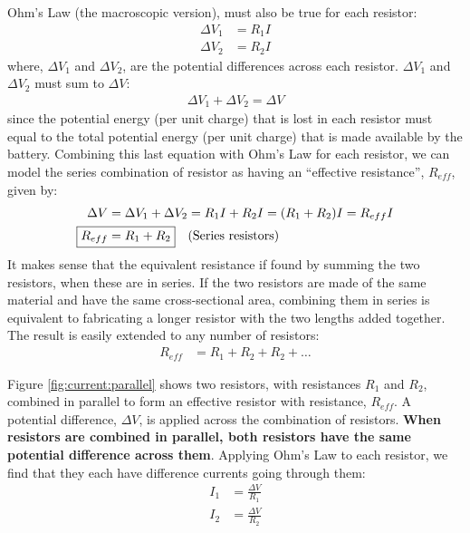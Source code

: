 Ohm's Law (the macroscopic version), must also be true for each resistor:
\begin{align*}
\Delta V_1 &= R_1I\\
\Delta V_2 &= R_2I
\end{align*}
where, $\Delta V_1$ and $\Delta V_2$, are the potential differences across each resistor. $\Delta V_1$ and $\Delta V_2$ must sum to $\Delta V$:
\begin{align*}
\Delta V_1 + \Delta V_2=\Delta V
\end{align*}
since the potential energy (per unit charge) that is lost in each resistor must equal to the total potential energy (per unit charge) that is made available by the battery. Combining this last equation with Ohm's Law for each resistor, we can model the series combination of resistor as having an ``effective resistance'', $R_{eff}$, given by:
\begin{align*}
\Delta V &= \Delta V_1 + \Delta V_2=R_1I+R_2I=(R_1+R_2)I=R_{eff}I\\
 \Aboxed{R_{eff}&=R_1+R_2}\quad \text{(Series resistors)}
\end{align*}
It makes sense that the equivalent resistance if found by summing the two resistors, when these are in series. If the two resistors are made of the same material and have the same cross-sectional area, combining them in series is equivalent to fabricating a longer resistor with the two lengths added together. The result is easily extended to any number of resistors:
\begin{align*}
R_{eff}&=R_1+R_2+R_2+\dots
\end{align*}

Figure \ref{fig:current:parallel} shows two resistors, with resistances $R_1$ and $R_2$, combined in parallel to form an effective resistor with resistance, $R_{eff}$. A potential difference, $\Delta V$, is applied across the combination of resistors. \textbf{When resistors are combined in parallel, both resistors have the same potential difference across them}.
Applying Ohm's Law to each resistor, we find that they each have difference currents going through them:
\begin{align*}
I_1&=\frac{\Delta V}{R_1}\\
I_2&=\frac{\Delta V}{R_2}
\end{align*}

